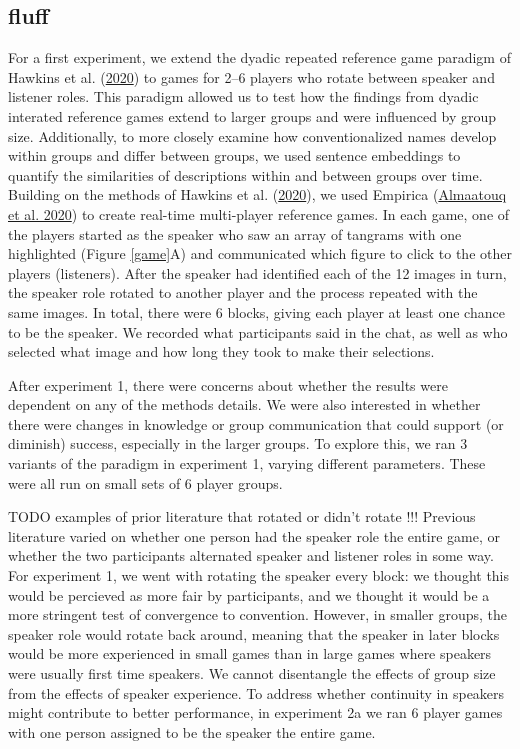 \documentclass[
  english,
  a4paper,
]{article}
\begin{document}
\hypertarget{fluff}{%
\subsection{fluff}\label{fluff}}

For a first experiment, we extend the dyadic repeated reference game paradigm of Hawkins et al. (\protect\hyperlink{ref-hawkinsCharacterizingDynamicsLearning2020}{2020}) to games for 2--6 players who rotate between speaker and listener roles. This paradigm allowed us to test how the findings from dyadic interated reference games extend to larger groups and were influenced by group size. Additionally, to more closely examine how conventionalized names develop within groups and differ between groups, we used sentence embeddings to quantify the similarities of descriptions within and between groups over time.
Building on the methods of Hawkins et al. (\protect\hyperlink{ref-hawkinsCharacterizingDynamicsLearning2020}{2020}), we used Empirica (\protect\hyperlink{ref-almaatouqEmpiricaVirtualLab2020}{Almaatouq et al. 2020}) to create real-time multi-player reference games. In each game, one of the players started as the speaker who saw an array of tangrams with one highlighted (Figure \ref{game}A) and communicated which figure to click to the other players (listeners). After the speaker had identified each of the 12 images in turn, the speaker role rotated to another player and the process repeated with the same images. In total, there were 6 blocks, giving each player at least one chance to be the speaker. We recorded what participants said in the chat, as well as who selected what image and how long they took to make their selections.

After experiment 1, there were concerns about whether the results were dependent on any of the methods details. We were also interested in whether there were changes in knowledge or group communication that could support (or diminish) success, especially in the larger groups. To explore this, we ran 3 variants of the paradigm in experiment 1, varying different parameters. These were all run on small sets of 6 player groups.

TODO examples of prior literature that rotated or didn't rotate !!!
Previous literature varied on whether one person had the speaker role the entire game, or whether the two participants alternated speaker and listener roles in some way. For experiment 1, we went with rotating the speaker every block: we thought this would be percieved as more fair by participants, and we thought it would be a more stringent test of convergence to convention. However, in smaller groups, the speaker role would rotate back around, meaning that the speaker in later blocks would be more experienced in small games than in large games where speakers were usually first time speakers. We cannot disentangle the effects of group size from the effects of speaker experience. To address whether continuity in speakers might contribute to better performance, in experiment 2a we ran 6 player games with one person assigned to be the speaker the entire game.
\end{document}
